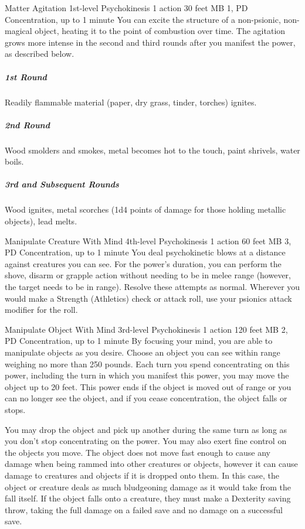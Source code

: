\DndPowerHeader%
  {Matter Agitation}
  {1st-level Psychokinesis}
  {1 action}
  {30 feet}
  {MB 1, PD \lvlone}
  {Concentration, up to 1 minute}
You can excite the structure of a non-psionic,
non-magical object,
heating it to the point of combustion over time.
The agitation grows more intense in the second and third rounds
after you manifest the power, as described below.

\subparagraph{1st Round}
  Readily flammable material
  (paper, dry grass, tinder, torches) ignites.
\subparagraph{2nd Round}
  Wood smolders and smokes,
  metal becomes hot to the touch,
  paint shrivels, water boils.
\subparagraph{3rd and Subsequent Rounds}
  Wood ignites, metal scorches
  (1d4 points of damage for those holding metallic objects),
  lead melts.

\DndPowerHeader%
  {Manipulate Creature With Mind}
  {4th-level Psychokinesis}
  {1 action}
  {60 feet}
  {MB 3, PD \lvlfour}
  {Concentration, up to 1 minute}
You deal psychokinetic blows at a distance
against creatures you can see.
For the power's duration,
you can perform the shove, disarm or grapple action
without needing to be in melee range
(however, the target needs to be in range).
Resolve these attempts as normal.
Wherever you would make a Strength (Athletics) check or attack roll,
use your psionics attack modifier for the roll.
  
  \DndPowerHeader%
    {Manipulate Object With Mind}
    {3rd-level Psychokinesis}
    {1 action}
    {120 feet}
    {MB 2, PD \lvlthree}
    {Concentration, up to 1 minute}
By focusing your mind, you are able to manipulate objects as you desire.
Choose an object you can see within range
weighing no more than 250 pounds.
Each turn you spend concentrating on this power,
including the turn in which you manifest this power,
you may move the object up to 20 feet.
This power ends if the object is moved out of range
or you can no longer see the object,
and if you cease concentration,
the object falls or stops.

You may drop the object and pick up another during
the same turn as long as you don't stop concentrating
on the power.
You may also exert fine control on the objects you move.
The object does not move fast enough to cause any damage
when being rammed into other creatures or objects,
however it can cause damage to creatures and objects
if it is dropped onto them.
In this case, the object or creature deals as much
bludgeoning damage as it would take from the fall itself.
If the object falls onto a creature,
they must make a Dexterity saving throw, taking the full
damage on a failed save and no damage on a successful save.

